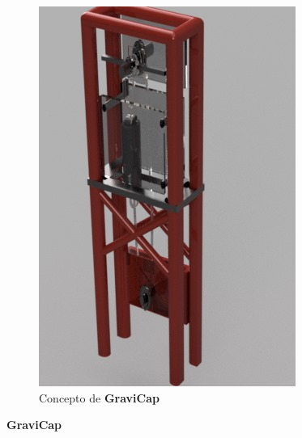 \begin{figure}[H]
\begin{subfigure}[b]{0.3\textwidth}
                    \includegraphics[width=\textwidth]{Imagenes/Estructura/Concepto.jpg}
                    \caption{Concepto de \textcolor{dark_violet}{\textbf{GraviCap}}}
                    \label{fig:e1.2}
                \end{subfigure}
                \caption{\textcolor{dark_violet}{\textbf{GraviCap}}}
                \label{fig:e1}
            \end{figure}
            

